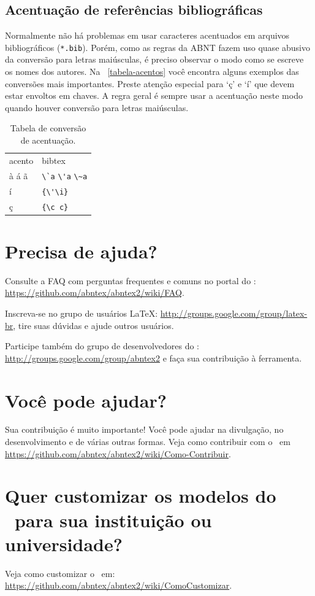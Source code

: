 \subsection{Acentuação de referências bibliográficas}

Normalmente não há problemas em usar caracteres acentuados em arquivos
bibliográficos (\texttt{*.bib}). Porém, como as regras da ABNT fazem uso quase
abusivo da conversão para letras maiúsculas, é preciso observar o modo como se
escreve os nomes dos autores. Na ~\autoref{tabela-acentos} você encontra alguns
exemplos das conversões mais importantes. Preste atenção especial para `ç' e `í'
que devem estar envoltos em chaves. A regra geral é sempre usar a acentuação
neste modo quando houver conversão para letras maiúsculas.

\begin{table}[htbp]
\caption{Tabela de conversão de acentuação.}
\label{tabela-acentos}

\begin{center}
\begin{tabular}{ll}\hline\hline
acento & \textsf{bibtex}\\
à á ã & \verb+\`a+ \verb+\'a+ \verb+\~a+\\
í & \verb+{\'\i}+\\
ç & \verb+{\c c}+\\
\hline\hline
\end{tabular}
\end{center}
\end{table}


\section{Precisa de ajuda?}

Consulte a FAQ com perguntas frequentes e comuns no portal do \abnTeX:
\url{https://github.com/abntex/abntex2/wiki/FAQ}.

Inscreva-se no grupo de usuários \LaTeX:
\url{http://groups.google.com/group/latex-br}, tire suas dúvidas e ajude
outros usuários.

Participe também do grupo de desenvolvedores do \abnTeX:
\url{http://groups.google.com/group/abntex2} e faça sua contribuição à
ferramenta.

\section{Você pode ajudar?}

Sua contribuição é muito importante! Você pode ajudar na divulgação, no
desenvolvimento e de várias outras formas. Veja como contribuir com o \abnTeX\
em \url{https://github.com/abntex/abntex2/wiki/Como-Contribuir}.

\section{Quer customizar os modelos do \abnTeX\ para sua instituição ou
universidade?}

Veja como customizar o \abnTeX\ em:
\url{https://github.com/abntex/abntex2/wiki/ComoCustomizar}.

